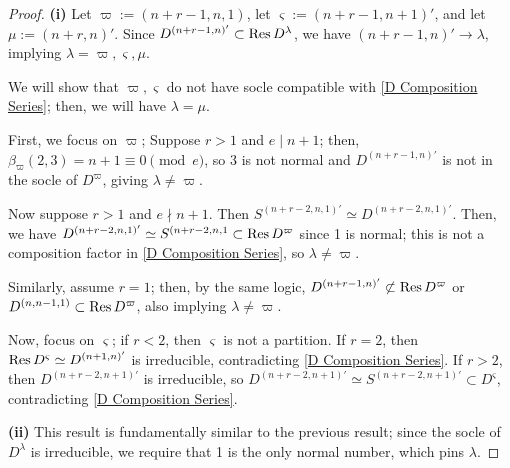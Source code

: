 \documentclass{amsart}
\begin{document}
\begin{proof}
  \textbf{(i)}
  Let $\varpi := (n+r-1,n,1)$, let $\varsigma := (n+r-1,n+1)'$, and let $\mu := (n + r,n)'$.
  Since $D^{(n+r-1,n)'} \subset \text{Res} \, D^\lambda$, we have $(n + r - 1,n)' \longrightarrow \lambda$, implying $\lambda = \varpi,\varsigma,\mu$.
  
  We will show that $\varpi, \varsigma$ do not have socle compatible with \eqref{D Composition Series};
  then, we will have $\lambda = \mu$.

  First, we focus on $\varpi$;
  Suppose $r > 1$ and $e \mid n + 1$;
  then, $\beta_{\varpi}(2,3) = n + 1 \equiv 0 \pmod e$, so $3$ is not normal and $D^{(n+r-1,n)'}$ is not in the socle of $D^\varpi$, giving $\lambda \neq \varpi$.
  
  Now suppose $r > 1$ and $e \nmid n + 1$.
  Then $S^{(n+r-2,n,1)'} \simeq D^{(n+r-2,n,1)'}$.
  Then, we have $D^{(n + r - 2,n,1)'} \simeq S^{(n + r - 2,n,1} \subset \text{Res} \, D^{\varpi}$ since 1 is normal;
  this is not a composition factor in \eqref{D Composition Series}, so $\lambda \neq \varpi$.
  

  Similarly, assume $r = 1$;
  then, by the same logic, $D^{(n+r-1,n)'} \not\subset \text{Res} \, D^\varpi$ or $D^{(n,n-1,1)} \subset \text{Res} \, D^\varpi$, also implying $\lambda \neq \varpi$.
  \iffalse %
  \begin{align*}
    \beta_{\varpi}(1,2)     &= r + 1 \\
    \beta_{\varpi}(1,3)     &= n + r + 1 \\
    \beta_{\varpi}(2,3)     &= n + 1\\
    \gamma_{\varpi}(1,2)    &= r\\
    \gamma_{\varpi}(1,3)    &= n + r\\
    \gamma_{\varpi}(2,3)    &= n\\
  \end{align*}
  \fi

  \vspace{5pt}
  Now, focus on $\varsigma$;
  if $r < 2$, then $\varsigma$ is not a partition.
  If $r = 2$, then $\text{Res} \, D^\varsigma \simeq D^{(n+1,n)'}$ is irreducible, contradicting \eqref{D Composition Series}. 
  If $r > 2$, then $D^{(n + r - 2,n+1)'}$ is irreducible, so $D^{(n+r-2,n+1)'} \simeq S^{(n+r-2,n+1)'} \subset D^\varsigma$, contradicting \eqref{D Composition Series}.

  \textbf{(ii)}
  This result is fundamentally similar to the previous result;
  since the socle of $D^\lambda$ is irreducible, we require that 1 is the only normal number, which pins $\lambda$.
\end{proof}
\end{document}
